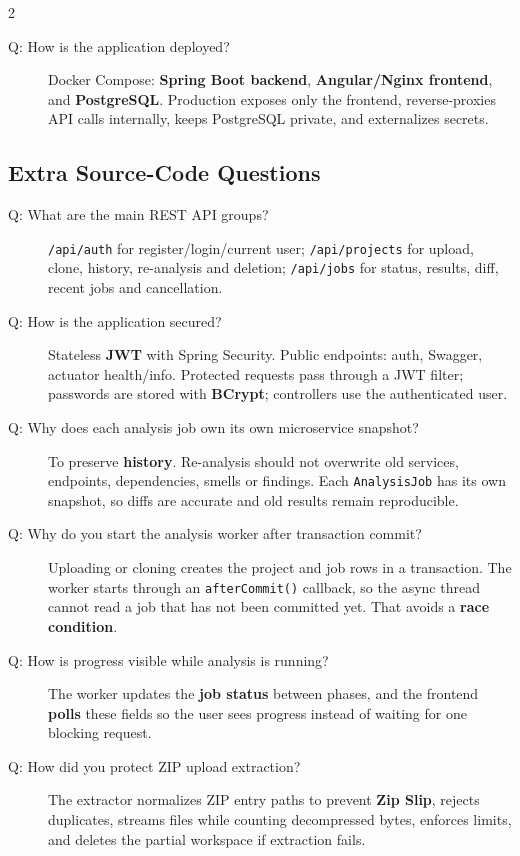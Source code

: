 \documentclass[10pt,a4paper]{article}
\begin{document}
\begin{multicols}{2}
\begin{description}
    \item[Q: How is the application deployed?]
    Docker Compose: \textbf{Spring Boot backend}, \textbf{Angular/Nginx frontend}, and \textbf{PostgreSQL}. Production exposes only the frontend, reverse-proxies API calls internally, keeps PostgreSQL private, and externalizes secrets.
\end{description}

\subsection{Extra Source-Code Questions}

\begin{description}
    \item[Q: What are the main REST API groups?]
    \texttt{/api/auth} for register/login/current user; \texttt{/api/projects} for upload, clone, history, re-analysis and deletion; \texttt{/api/jobs} for status, results, diff, recent jobs and cancellation.

    \item[Q: How is the application secured?]
    Stateless \textbf{JWT} with Spring Security. Public endpoints: auth, Swagger, actuator health/info. Protected requests pass through a JWT filter; passwords are stored with \textbf{BCrypt}; controllers use the authenticated user.

    \item[Q: Why does each analysis job own its own microservice snapshot?]
    To preserve \textbf{history}. Re-analysis should not overwrite old services, endpoints, dependencies, smells or findings. Each \texttt{AnalysisJob} has its own snapshot, so diffs are accurate and old results remain reproducible.

    \item[Q: Why do you start the analysis worker after transaction commit?]
    Uploading or cloning creates the project and job rows in a transaction. The worker starts through an \texttt{afterCommit()} callback, so the async thread cannot read a job that has not been committed yet. That avoids a \textbf{race condition}.

    \item[Q: How is progress visible while analysis is running?]
    The worker updates the \textbf{job status} between phases, and the frontend \textbf{polls} these fields so the user sees progress instead of waiting for one blocking request.

    \item[Q: How did you protect ZIP upload extraction?]
    The extractor normalizes ZIP entry paths to prevent \textbf{Zip Slip}, rejects duplicates, streams files while counting decompressed bytes, enforces limits, and deletes the partial workspace if extraction fails.


\end{description}
\end{multicols}
\end{document}
